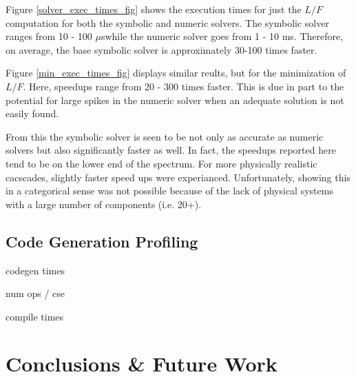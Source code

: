 \documentclass[preprint,12pt]{elsarticle}
\newcommand{\us}[0]{$\mu$s}
\begin{document}
Figure \ref{solver_exec_times_fig} shows the execution times for just the $L/F$ 
computation for both the symbolic and numeric solvers.  The symbolic solver ranges
from 10 - 100 \us while the numeric solver goes from 1 - 10 ms.  Therefore, 
on average, the base symbolic solver is approximately 30-100 times faster.

Figure \ref{min_exec_times_fig} displays similar reults, but for the minimization
of $L/F$.  Here, speedups range from 20 - 300 times faster.  This is due in part 
to the potential for large spikes in the numeric solver when an adequate solution 
is not easily found.  

From this the symbolic solver is seen to be not only as accurate as numeric solvers
but also significantly faster as well.  In fact, the speedups reported here tend
to be on the lower end of the spectrum.  For more physically realistic cacscades, 
slightly faster speed ups were experianced.  Unfortunately, showing this in a 
categorical sense was not possible because of the lack of physical systems with a
large number of components (i.e. 20+).


\subsection{Code Generation Profiling}
\label{sec:codegen-prof}
codegen times

num ops / cse

compile times

\section{Conclusions \& Future Work}
\label{sec:conc}


\end{document}
